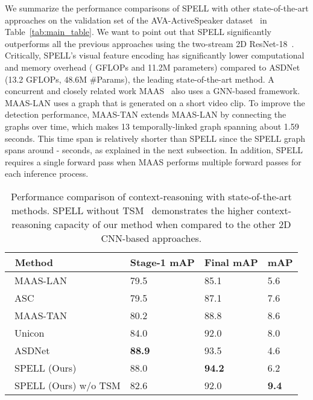 \documentclass[runningheads]{llncs}
\begin{document}
We summarize the performance comparisons of SPELL with other state-of-the-art approaches on the validation set of the AVA-ActiveSpeaker dataset~\cite{roth2020ava} in Table~\ref{tab:main_table}. We want to point out that SPELL significantly outperforms all the previous approaches using the two-stream 2D ResNet-18~\cite{he2016deep}. Critically, SPELL's visual feature encoding has significantly lower computational and memory overhead ( GFLOPs and 11.2M parameters) compared to 
ASDNet~\cite{ASDNet_ICCV2021} (13.2 GFLOPs, 48.6M \#Params), the leading state-of-the-art method. A concurrent and closely related work MAAS~\cite{MAAS2021} also uses a GNN-based framework. MAAS-LAN uses a graph that is generated on a short video clip. To improve the detection performance, MAAS-TAN extends MAAS-LAN by connecting the graphs over time, which makes 13 temporally-linked graph spanning about 1.59 seconds. This time span is relatively shorter than SPELL since the SPELL graph spans around 
- seconds, as explained in the next subsection. In addition, SPELL requires a single forward pass when MAAS performs multiple forward passes for each inference process.

\begin{table}[t]
\centering
\caption{Performance comparison of context-reasoning with state-of-the-art methods. SPELL without TSM~\cite{lin2019tsm} demonstrates the higher context-reasoning capacity of our method when compared to the other 2D CNN-based approaches.}
\begin{tabular}{L{4.2cm}|C{2.4cm}|C{2.4cm}|C{2.4cm}}
\toprule
\, \textbf{Method} & \textbf{Stage-1 mAP} & \textbf{Final mAP} & \textbf{mAP} \\ \midrule
\, MAAS-LAN~\cite{MAAS2021} & 79.5 & 85.1 & 5.6\\
\, ASC~\cite{alcazarActiveSpeakersContext2020} & 79.5 & 87.1 & 7.6\\ 
\, MAAS-TAN~\cite{MAAS2021} & 80.2 & 88.8 & 8.6\\
\, Unicon~\cite{zhang2021unicon} & 84.0 & 92.0 & 8.0 \\
\, ASDNet~\cite{ASDNet_ICCV2021} & \textbf{88.9} & 93.5 & 4.6\\
\, SPELL (Ours) & 88.0 & \textbf{94.2} & 6.2 \\
\, SPELL (Ours) w/o TSM & 82.6 & 92.0 & \textbf{9.4} \\
\bottomrule
\end{tabular}
\label{tab:context_capacity}
\end{table}
\end{document}
